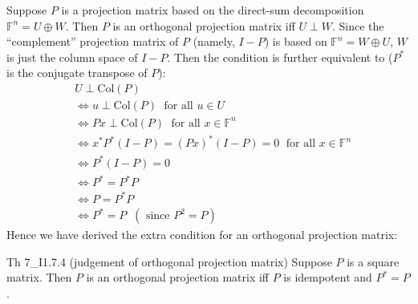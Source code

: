 \documentclass{article}
\begin{document}
Suppose $P$ is a projection matrix based on the direct-sum decomposition $\mathbb{F}^n = U\oplus W$. Then $P$ is an orthogonal projection matrix iff $U\perp W$. Since the ``complement'' projection matrix of $P$ (namely, $I-P$) is based on $\mathbb{F}^n = W\oplus U$, $W$ is just the column space of $I-P$. Then the condition is further equivalent to ($P^\ast$ is the conjugate transpose of $P$):
$$
\begin{aligned}
    & U\perp \text{Col}(P) \\
    & \Leftrightarrow u\perp \text{Col}(P) \;\text{ for all } u\in U \\
    & \Leftrightarrow Px\perp \text{Col}(P) \;\text{ for all } x\in\mathbb{F}^n \\
    & \Leftrightarrow x^\ast P^\ast (I-P) = (Px)^\ast (I-P) = 0 \;\text{ for all } x\in\mathbb{F}^n \\
    & \Leftrightarrow P^\ast (I-P) = 0 \\
    & \Leftrightarrow P^\ast = P^\ast P \\
    & \Leftrightarrow P = P^\ast P \\
    & \Leftrightarrow P^\ast = P \;\;(\text{ since } P^2 = P )
\end{aligned}
$$
Hence we have derived the extra condition for an orthogonal projection matrix:
\begin{Th}{Th 7\_I1.7.4 (judgement of orthogonal projection matrix)}
    Suppose $P$ is a square matrix. Then $P$ is an orthogonal projection matrix iff $P$ is idempotent and $P^\ast = P$.
\end{Th}
\end{document}
